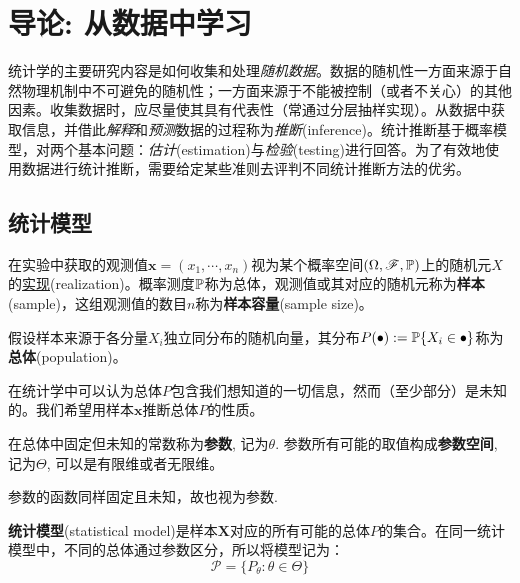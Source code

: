 \chapter{导论: 从数据中学习}\label{ch:intro}

统计学的主要研究内容是如何收集和处理\emph{随机数据}。数据的随机性一方面来源于自然物理机制中不可避免的随机性；一方面来源于不能被控制（或者不关心）的其他因素。收集数据时，应尽量使其具有代表性（常通过分层抽样实现）。从数据中获取信息，并借此\emph{解释}和\emph{预测}数据的过程称为\emph{推断}(inference)。统计推断基于概率模型，对两个基本问题：\emph{估计}(estimation)与\emph{检验}(testing)进行回答。为了有效地使用数据进行统计推断，需要给定某些准则去评判不同统计推断方法的优劣。

\section{统计模型}\label{sec:inference}

\begin{definition}[样本]
      在实验中获取的观测值$\mathbf{x}=(x_1, \cdots ,x_n)$视为某个概率空间$(\Omega,\mathscr{F},\P)$上的随机元$X$的\underline{实现}(realization)。概率测度$\P$称为总体，观测值或其对应的随机元称为\textbf{样本}(sample)，这组观测值的数目$n$称为\textbf{样本容量}(sample size)。
\end{definition}

\begin{definition}[总体]
      假设样本来源于各分量$X_i$独立同分布的随机向量，其分布$P(\bullet):=\P\{X_i \in \bullet\}$称为\textbf{总体}(population)。
\end{definition}

在统计学中可以认为总体$P$包含我们想知道的一切信息，然而（至少部分）是未知的。我们希望用样本$\mathbf{x}$推断总体$P$的性质。

\begin{definition}[参数]
      在总体中固定但未知的常数称为\textbf{参数}, 记为$\theta$. 参数所有可能的取值构成\textbf{参数空间}, 记为$\Theta$, 可以是有限维或者无限维。
\end{definition}
\begin{remark}
      参数的函数同样固定且未知，故也视为参数. 
\end{remark}

\begin{definition}[统计模型]
      \textbf{统计模型}(statistical model)是样本$\mathbf{X}$对应的所有可能的总体$P$的集合。在同一统计模型中，不同的总体通过参数区分，所以将模型记为：
      \[ \mathcal{P}=\{ P_{\theta}:\theta \in \Theta \} \]
\end{definition}

